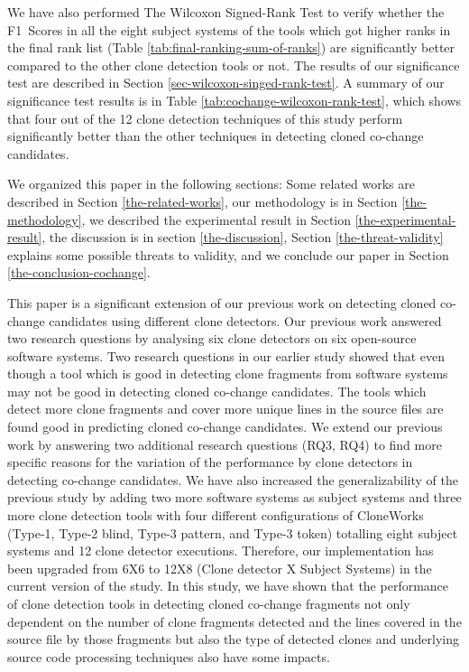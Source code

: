 \documentclass[review]{elsarticle}
\begin{document}
We have also performed The Wilcoxon Signed-Rank Test \cite{wilcoxon-signed-rank-test, wilcoxon-signed-rank-test-rosner} to verify whether the F1~Scores in all the eight subject systems of the tools which got higher ranks in the final rank list (Table \ref{tab:final-ranking-sum-of-ranks}) are significantly better compared to the other clone detection tools or not. The results of our significance test are described in Section \ref{sec-wilcoxon-singed-rank-test}. A summary of our significance test results is in Table \ref{tab:cochange-wilcoxon-rank-test}, which shows that four out of the 12 clone detection techniques of this study perform significantly better than the other techniques in detecting cloned co-change candidates.

We organized this paper in the following sections: Some related works are described in Section \ref{the-related-works}, our methodology is in Section \ref{the-methodology}, we described the experimental result in Section \ref{the-experimental-result}, the discussion is in section \ref{the-discussion}, Section \ref{the-threat-validity} explains some possible threats to validity, and we conclude our paper in Section \ref{the-conclusion-cochange}.

This paper is a significant extension of our previous work \cite{nadim-iwsc-2020} on detecting cloned co-change candidates using different clone detectors. Our previous work answered two research questions by analysing six clone detectors on six open-source software systems. Two research questions in our earlier study showed that even though a tool which is good in detecting clone fragments from software systems may not be good in detecting cloned co-change candidates. The tools which detect more clone fragments and cover more unique lines in the source files are found good in predicting cloned co-change candidates. We extend our previous work by answering two additional research questions (RQ3, RQ4) to find more specific reasons for the variation of the performance by clone detectors in detecting co-change candidates. We have also increased the generalizability of the previous study by adding two more software systems as subject systems and three more clone detection tools with four different configurations of CloneWorks (Type-1, Type-2 blind, Type-3 pattern, and Type-3 token) totalling eight subject systems and 12 clone detector executions. Therefore, our implementation has been upgraded from 6X6 to 12X8 (Clone detector X Subject Systems) in the current version of the study. In this study, we have shown that the performance of clone detection tools in detecting cloned co-change fragments not only dependent on the number of clone fragments detected and the lines covered in the source file by those fragments but also the type of detected clones and underlying source code processing techniques also have some impacts.
\end{document}

